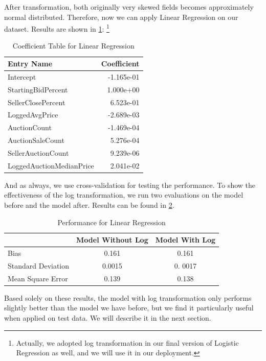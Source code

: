 \documentclass[CEJM,PDF]{cej} %
\begin{document}
After transformation, both originally very skewed fields becomes approximately normal distributed. Therefore, now we can apply Linear Regression on our dataset. Results are shown in \ref{r-linear}:
\footnote{Actually, we adopted log transformation in our final version of Logistic Regression as well, and we will use it in our deployment. }
\begin{table}[h]
\centering
\caption{Coefficient Table for Linear Regression}
\label{r-linear}
\begin{tabular}{@{}|l|r|@{}}
\toprule
\hline
Entry Name  & Coefficient \\ \midrule
\hline
Intercept & -1.165e-01   \\
\hline
StartingBidPercent & 1.000e+00 \\
\hline
SellerClosePercent & 6.523e-01  \\
\hline
LoggedAvgPrice & -2.689e-03 \\
\hline
AuctionCount & -1.469e-04   \\
\hline
AuctionSaleCount & 5.276e-04 \\
\hline
SellerAuctionCount & 9.239e-06   \\
\hline
LoggedAuctionMedianPrice & 2.041e-02  \\ \bottomrule
\hline
\end{tabular}
\end{table}

And as always, we use cross-validation for testing the performance. To show the effectiveness of the log transformation, we run two evaluations on the model before and the model after.  Results can be found in \ref{comp}.

\begin{table}[h]
\centering
\caption{Performance for Linear Regression}
\label{comp}
\begin{tabular}{@{}|l|c|c|@{}}
\toprule
\hline
    & Model Without Log  & Model With Log \\ \midrule
\hline
  Bias  &  0.161 & 0.161  \\ 
\hline
  Standard Deviation  &  0.0015  &  0. 0017 \\ 
\hline
  Mean Square Error    &  0.139  &  0.138  \\
\bottomrule \hline
\end{tabular}
\end{table}

Based solely on these results, the model with log transformation only performs slightly better than the model we have before, but we find it particularly useful when applied on test data. We will describe it in the next section.
\end{document}
